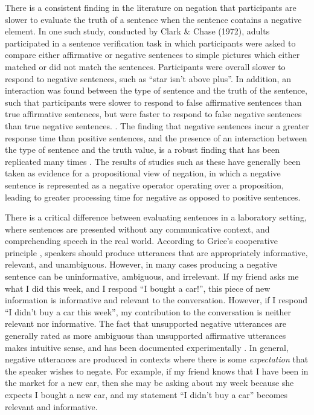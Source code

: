 \documentclass[10pt,letterpaper]{article}
\begin{document}
There is a consistent finding in the literature on negation that participants are slower to evaluate the truth of a sentence when the sentence contains a negative element.  In one such study, conducted by Clark \& Chase (1972), adults participated in a sentence verification task in which participants were asked to compare either affirmative or negative sentences to simple pictures which either matched or did not match the sentences.  Participants were overall slower to respond to negative sentences, such as ``star isn't above plus''.  In addition, an interaction was found between the type of sentence and the truth of the sentence, such that participants were slower to respond to false affirmative sentences than true affirmative sentences, but were faster to respond to false negative sentences than true negative sentences.  \cite{hclark1972}.  The finding that negative sentences incur a greater response time than positive sentences, and the presence of an interaction between the type of sentence and the truth value, is a robust finding that has been replicated many times  \cite{carpenter1975, just1971, just1976}.  The results of studies such as these have generally been taken as evidence for a propositional view of negation, in which a negative sentence is represented as a negative operator operating over a proposition, leading to greater processing time for negative as opposed to positive sentences.  

There is a critical difference between evaluating sentences in a laboratory setting, where sentences are presented without any communicative context, and comprehending speech in the real world. According to Grice's cooperative principle \cite{grice1975}, speakers should produce utterances that are appropriately informative, relevant, and unambiguous.  However, in many cases producing a negative sentence can be uninformative, ambiguous, and irrelevant.  If my friend asks me what I did this week, and I respond ``I bought a car!'', this piece of new information is informative and relevant to the conversation.  However, if I respond ``I didn't buy a car this week'', my contribution to the conversation is neither relevant nor informative.  The fact that unsupported negative utterances are generally rated as more ambiguous than unsupported affirmative utterances makes intuitive sense, and has been documented experimentally \cite{glenberg1999}.  In general, negative utterances are produced in contexts where there is some \emph{expectation} that the speaker wishes to negate.  For example, if my friend knows that I have been in the market for a new car, then she may be asking about my week because she expects I bought a new car, and my statement ``I didn't buy a car'' becomes relevant and informative.  
\end{document}
